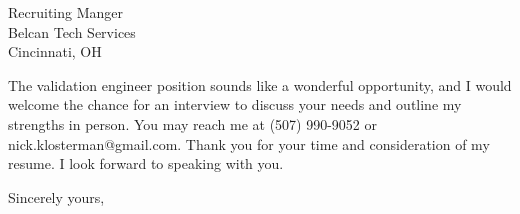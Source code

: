 \documentclass{letter} %
\newcommand{\position}{validation engineer }%
\begin{document}
\begin{letter}{Recruiting Manger \\
Belcan Tech Services \\
Cincinnati, OH

}
 
\noindent 
The \position position sounds like a wonderful opportunity, and I would welcome the chance for an interview to discuss your needs and outline my strengths in person. 
You may reach me at (507) 990-9052 or nick.klosterman@gmail.com.
Thank you for your time and consideration of my resume. I look forward to speaking with you.
 

\closing{Sincerely yours,} 
 

 

\end{letter}
 
\end{document}
